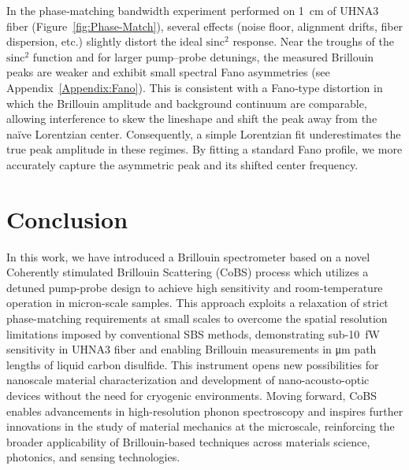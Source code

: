 In the phase‐matching bandwidth experiment performed on \SI{1}{\centi\meter} of \ac{UHNA3} fiber (Figure~\ref{fig:Phase-Match}), several effects (noise floor, alignment drifts, fiber dispersion, etc.) slightly distort the ideal \(\mathrm{sinc^{2}}\) response. Near the troughs of the \(\mathrm{sinc^{2}}\) function and for larger pump–probe detunings, the measured Brillouin peaks are weaker and exhibit small spectral Fano asymmetries (see Appendix~\ref{Appendix:Fano}). This is consistent with a Fano‐type distortion in which the Brillouin amplitude and background continuum are comparable, allowing interference to skew the lineshape and shift the peak away from the naïve Lorentzian center. Consequently, a simple Lorentzian fit underestimates the true peak amplitude in these regimes. By fitting a standard Fano profile, we more accurately capture the asymmetric peak and its shifted center frequency.

\section{Conclusion}
\label{Conclusion}

In this work, we have introduced a Brillouin spectrometer based on a novel Coherently stimulated Brillouin Scattering (\ac{CoBS}) process which utilizes a detuned pump-probe design to achieve high sensitivity and room-temperature operation in micron-scale samples. This approach exploits a relaxation of strict phase-matching requirements at small scales to overcome the spatial resolution limitations imposed by conventional \ac{SBS} methods, demonstrating sub-\SI{10}{\femto\watt} sensitivity in \ac{UHNA3} fiber and enabling Brillouin measurements in \si{\micro\meter} path lengths of liquid carbon disulfide. This instrument opens new possibilities for nanoscale material characterization and development of nano-acousto-optic devices without the need for cryogenic environments. Moving forward, \ac{CoBS} enables advancements in high-resolution phonon spectroscopy and inspires further innovations in the study of material mechanics at the microscale, reinforcing the broader applicability of Brillouin-based techniques across materials science, photonics, and sensing technologies.

\clearpage
\thispagestyle{empty}
\null
\newpage
